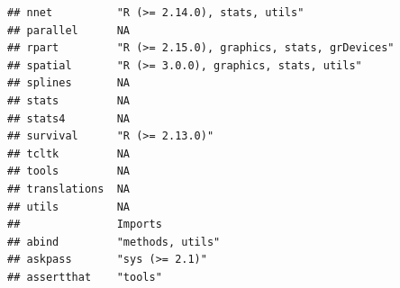\documentclass[]{article}
\begin{document}
\begin{verbatim}
## nnet          "R (>= 2.14.0), stats, utils"                                            
## parallel      NA                                                                       
## rpart         "R (>= 2.15.0), graphics, stats, grDevices"                              
## spatial       "R (>= 3.0.0), graphics, stats, utils"                                   
## splines       NA                                                                       
## stats         NA                                                                       
## stats4        NA                                                                       
## survival      "R (>= 2.13.0)"                                                          
## tcltk         NA                                                                       
## tools         NA                                                                       
## translations  NA                                                                       
## utils         NA                                                                       
##               Imports                                                                                                                                                                                                                                                                                                                                                                                                                                                                               
## abind         "methods, utils"                                                                                                                                                                                                                                                                                                                                                                                                                                                                      
## askpass       "sys (>= 2.1)"                                                                                                                                                                                                                                                                                                                                                                                                                                                                        
## assertthat    "tools"                                                                                                                                                                                                                                                                                                                                                                                                                                                                               

\end{verbatim}
\end{document}
